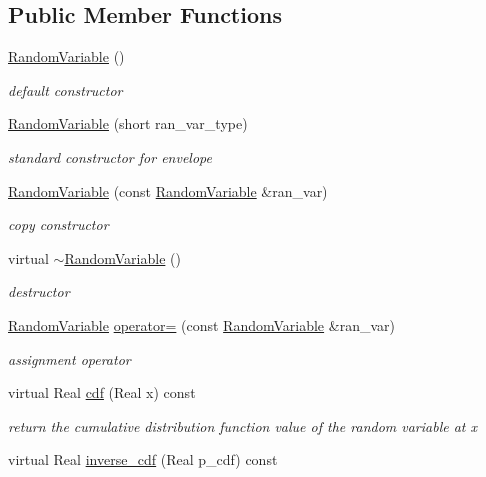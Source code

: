 \subsection*{Public Member Functions}
\begin{DoxyCompactItemize}
\item 
\hyperlink{classPecos_1_1RandomVariable_af8d27c4a75949a0f406862027f697352}{Random\+Variable} ()
\begin{DoxyCompactList}\small\item\em default constructor \end{DoxyCompactList}\item 
\hyperlink{classPecos_1_1RandomVariable_a22473eb4390da3520f090db46d4e36df}{Random\+Variable} (short ran\+\_\+var\+\_\+type)
\begin{DoxyCompactList}\small\item\em standard constructor for envelope \end{DoxyCompactList}\item 
\hyperlink{classPecos_1_1RandomVariable_a555a92f8df4160b42b3ec25c281ef46e}{Random\+Variable} (const \hyperlink{classPecos_1_1RandomVariable}{Random\+Variable} \&ran\+\_\+var)
\begin{DoxyCompactList}\small\item\em copy constructor \end{DoxyCompactList}\item 
virtual \hyperlink{classPecos_1_1RandomVariable_a13020ea6f3178e7f54ed19a49e6b91b1}{$\sim$\+Random\+Variable} ()
\begin{DoxyCompactList}\small\item\em destructor \end{DoxyCompactList}\item 
\hyperlink{classPecos_1_1RandomVariable}{Random\+Variable} \hyperlink{classPecos_1_1RandomVariable_ae50e33fd3cce40c80d820ff108feb1ef}{operator=} (const \hyperlink{classPecos_1_1RandomVariable}{Random\+Variable} \&ran\+\_\+var)
\begin{DoxyCompactList}\small\item\em assignment operator \end{DoxyCompactList}\item 
virtual Real \hyperlink{classPecos_1_1RandomVariable_addd564e7f4f314e12d38df74d845f0d8}{cdf} (Real x) const \label{classPecos_1_1RandomVariable_addd564e7f4f314e12d38df74d845f0d8}

\begin{DoxyCompactList}\small\item\em return the cumulative distribution function value of the random variable at x \end{DoxyCompactList}\item 
virtual Real \hyperlink{classPecos_1_1RandomVariable_a918a1aac05ca349ea5313eebcba46c3e}{inverse\+\_\+cdf} (Real p\+\_\+cdf) const \label{classPecos_1_1RandomVariable_a918a1aac05ca349ea5313eebcba46c3e}


\end{DoxyCompactItemize}
